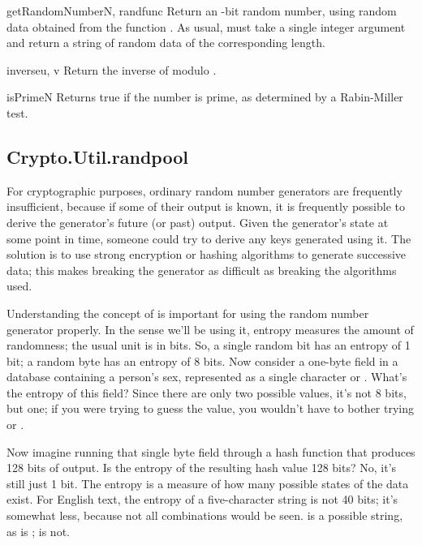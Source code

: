 \documentclass{howto}
\begin{document}
\begin{funcdesc}{getRandomNumber}{N, randfunc}
Return an -bit random number, using random data obtained from the
function .  As usual,  must take a single
integer argument and return a string of random data of the
corresponding length.
\end{funcdesc}

\begin{funcdesc}{inverse}{u, v}
Return the inverse of  modulo .
\end{funcdesc}

\begin{funcdesc}{isPrime}{N}
Returns true if the number  is prime, as determined by a
Rabin-Miller test.
\end{funcdesc}


\subsection{Crypto.Util.randpool}

For cryptographic purposes, ordinary random number generators are
frequently insufficient, because if some of their output is known, it
is frequently possible to derive the generator's future (or past)
output.  Given the generator's state at some point in time, someone
could try to derive any keys generated using it.  The solution is to
use strong encryption or hashing algorithms to generate successive
data; this makes breaking the generator as difficult as breaking the
algorithms used.

Understanding the concept of  is important for using the
random number generator properly.  In the sense we'll be using it,
entropy measures the amount of randomness; the usual unit is in bits.
So, a single random bit has an entropy of 1 bit; a random byte has an
entropy of 8 bits.  Now consider a one-byte field in a database containing a
person's sex, represented as a single character  or .
What's the entropy of this field?  Since there are only two possible
values, it's not 8 bits, but one; if you were trying to guess the value,
you wouldn't have to bother trying  or .  

Now imagine running that single byte field through a hash function that
produces 128 bits of output.  Is the entropy of the resulting hash value
128 bits?  No, it's still just 1 bit.  The entropy is a measure of how many
possible states of the data exist.  For English
text, the entropy of a five-character string is not 40 bits; it's
somewhat less, because not all combinations would be seen.  
is a possible string, as is ;  is not.
\end{document}
